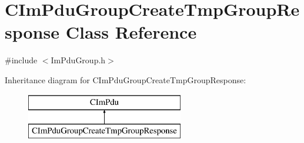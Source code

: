 \hypertarget{class_c_im_pdu_group_create_tmp_group_response}{}\section{C\+Im\+Pdu\+Group\+Create\+Tmp\+Group\+Response Class Reference}
\label{class_c_im_pdu_group_create_tmp_group_response}


{\ttfamily \#include $<$Im\+Pdu\+Group.\+h$>$}

Inheritance diagram for C\+Im\+Pdu\+Group\+Create\+Tmp\+Group\+Response\+:\begin{figure}[H]
\begin{center}
\leavevmode
\includegraphics[height=2.000000cm]{class_c_im_pdu_group_create_tmp_group_response}
\end{center}
\end{figure}

